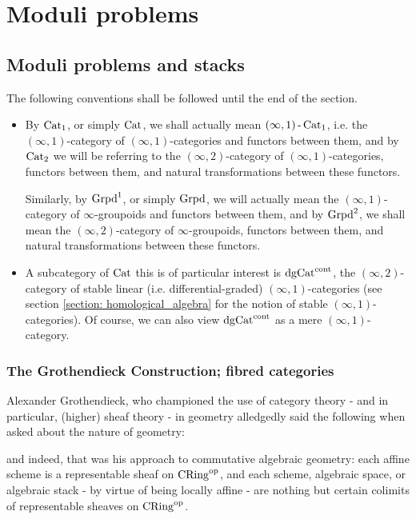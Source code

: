 \chapter{Moduli problems}
    \begin{abstract}
        
    \end{abstract}
    
    \minitoc
    
    \section{Moduli problems and stacks} \label{section: moduli_problems}
        The following conventions shall be followed until the end of the section.
        \begin{convention}
            \noindent
            \begin{itemize}
                \item By $\mathrm{Cat}_1$, or simply $\mathrm{Cat}$, we shall actually mean $(\infty, 1)\operatorname{-}\mathrm{Cat}_1$, i.e. the $(\infty, 1)$-category of $(\infty, 1)$-categories and functors between them, and by $\mathrm{Cat}_2$ we will be referring to the $(\infty, 2)$-category of $(\infty, 1)$-categories, functors between them, and natural transformations between these functors. 
                
                Similarly, by $\mathrm{Grpd}^1$, or simply $\mathrm{Grpd}$, we will actually mean the $(\infty, 1)$-category of $\infty$-groupoids and functors between them, and by $\mathrm{Grpd}^2$, we shall mean the $(\infty, 2)$-category of $\infty$-groupoids, functors between them, and natural transformations between these functors.
                \item A subcategory of $\mathrm{Cat}$ this is of particular interest is $\mathrm{dg}\mathrm{Cat}^{\mathrm{cont}}$, the $(\infty, 2)$-category of stable linear (i.e. differential-graded) $(\infty, 1)$-categories (see section \ref{section: homological_algebra} for the notion of stable $(\infty, 1)$-categories). Of course, we can also view $\mathrm{dg}\mathrm{Cat}^{\mathrm{cont}}$ as a mere $(\infty, 1)$-category.
            \end{itemize} 
        \end{convention}
    
        \subsection{The Grothendieck Construction; fibred categories}
            Alexander Grothendieck, who championed the use of category theory - and in particular, (higher) sheaf theory - in geometry alledgedly said the following when asked about the nature of geometry:
                \begin{center}
                \end{center}
            and indeed, that was his approach to commutative algebraic geometry: each affine scheme is a representable sheaf on $\mathrm{CRing}^{\mathrm{op}}$, and each scheme, algebraic space, or algebraic stack - by virtue of being locally affine - are nothing but certain colimits of representable sheaves on $\mathrm{CRing}^{\mathrm{op}}$. 
            
